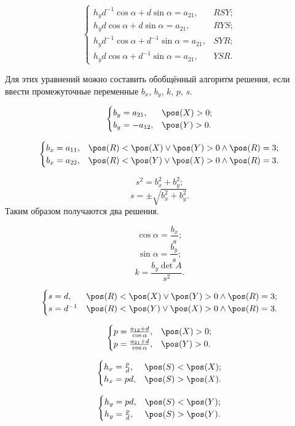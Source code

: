 $$\begin{cases}
	h_y d^{-1}\cos\alpha + d\sin\alpha = a_{21}, & RSY;\\
	h_y d\cos\alpha + d\sin\alpha = a_{21}, & RYS;\\
	h_y d^{-1}\cos\alpha + d^{-1}\sin\alpha = a_{21}, & SYR;\\
	h_y d\cos\alpha + d^{-1}\sin\alpha = a_{21}, & YSR.
\end{cases}$$

Для этих уравнений можно составить обобщённый алгоритм решения, если ввести промежуточные переменные
$b_x$, $b_y$, $k$, $p$, $s$.

$$\begin{cases}
	b_y = a_{21}, & \pos(X)>0;\\
	b_y = -a_{12}, & \pos(Y)>0.\\
\end{cases}$$

$$\begin{cases}
	b_x = a_{11}, & \pos(R) < \pos(X) \vee \pos(Y) > 0 \wedge \pos(R) = 3;\\
	b_x = a_{22}, & \pos(R) < \pos(Y) \vee \pos(X) > 0 \wedge \pos(R) = 3.
\end{cases}$$

$$s^2 = b_x^2 + b_y^2;$$
$$s = \pm \sqrt{b_x^2 + b_y^2}.$$
Таким образом получаются два решения.

$$\cos\alpha = \frac{b_x}{s};$$
$$\sin\alpha = \frac{b_y}{s};$$
$$k = \frac{b_y \det A}{s^2}.$$

$$\begin{cases}
	s = d,  & \pos(R) < \pos(X) \vee \pos(Y) > 0 \wedge \pos(R) = 3;\\
	s = d^{-1} & \pos(R) < \pos(Y) \vee \pos(X) > 0 \wedge \pos(R) = 3.
\end{cases}$$

$$\begin{cases}
	p = \frac{a_{12} + d}{\cos\alpha}, & \pos(X)>0;\\
	p = \frac{a_{21} + d}{\cos\alpha}, & \pos(Y)>0.
\end{cases}$$

$$\begin{cases}
	h_x = \frac{p}{d}, & \pos(S)<\pos(X);\\
	h_x = pd, & \pos(S)>\pos(X).
\end{cases}$$

$$\begin{cases}
	h_y = pd, & \pos(S)<\pos(Y);\\
	h_y = \frac{p}{d}, & \pos(S)>\pos(Y).
\end{cases}$$